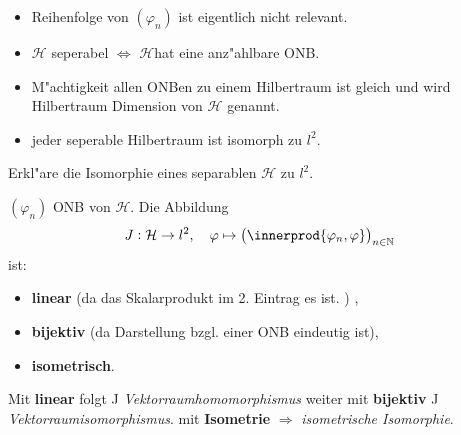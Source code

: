 \documentclass[9pt]{article}
\DeclarePairedDelimiter{\innerprod}\langle\rangle
\newcommand{\Hi}{\mathcal{H}}
\newenvironment{field}{}{\newpage}
\newif\ifnote
\newenvironment{note}{\notetrue}{\notefalse}
\begin{document}
\begin{note}
		\begin{field}  %
			\begin{itemize}
				\item Reihenfolge von $(\varphi_n)$ ist eigentlich nicht relevant.
				\item $\Hi$ seperabel $\Leftrightarrow$ $\Hi$hat eine anz"ahlbare ONB.
				\item M"achtigkeit allen ONBen zu einem Hilbertraum ist gleich und wird Hilbertraum Dimension von $\Hi$ genannt. 
				\item jeder seperable Hilbertraum ist isomorph zu $l^2$.
			\end{itemize}
		\end{field}
			
		\begin{field}  %
			Erkl"are die Isomorphie eines separablen $\Hi$ zu $l^2$.  
		\end{field}
		
		\begin{field}  %
			$(\varphi_n)$ ONB von $\Hi$. Die Abbildung 
			\begin{equation*}
				J: \Hi \rightarrow l^2,\quad \varphi \mapsto \qty(\innerprod{\varphi_n, \varphi})_{n\in \mathbb{N}}
			\end{equation*}
			ist: 
			\begin{itemize}
				\item \textbf{linear} (da das Skalarprodukt im 2. Eintrag es ist. ) ,
				\item \textbf{bijektiv} (da Darstellung bzgl. einer ONB eindeutig ist),
				\item \textbf{isometrisch}.
			\end{itemize}
		Mit \textbf{linear} folgt J \textit{Vektorraumhomomorphismus} weiter mit \textbf{bijektiv} J \textit{Vektorraumisomorphismus}. 
		 mit \textbf{Isometrie} $\Rightarrow$ \textit{isometrische Isomorphie}. 
		\end{field}
	\end{note}
\end{document}
